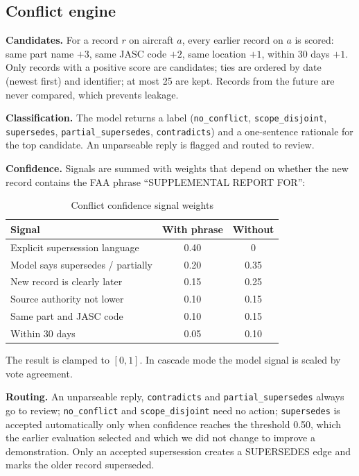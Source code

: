 \subsection{Conflict engine}

\textbf{Candidates.} For a record $r$ on aircraft $a$, every earlier record on $a$ is scored: same part name $+3$, same JASC code $+2$, same location $+1$, within 30 days $+1$. Only records with a positive score are candidates; ties are ordered by date (newest first) and identifier; at most 25 are kept. Records from the future are never compared, which prevents leakage.

\textbf{Classification.} The model returns a label (\texttt{no\_conflict}, \texttt{scope\_disjoint}, \texttt{supersedes}, \texttt{partial\_supersedes}, \texttt{contradicts}) and a one-sentence rationale for the top candidate. An unparseable reply is flagged and routed to review.

\textbf{Confidence.} Signals are summed with weights that depend on whether the new record contains the FAA phrase ``SUPPLEMENTAL REPORT FOR'':

\begin{table}[!htbp]
\centering
\caption{Conflict confidence signal weights}
\label{tab:confidence-weights}
\small
\begin{tabularx}{\textwidth}{@{}L c c@{}}
\toprule
Signal & With phrase & Without \\
\midrule
Explicit supersession language & 0.40 & 0 \\
Model says supersedes / partially & 0.20 & 0.35 \\
New record is clearly later & 0.15 & 0.25 \\
Source authority not lower & 0.10 & 0.15 \\
Same part and JASC code & 0.10 & 0.15 \\
Within 30 days & 0.05 & 0.10 \\
\bottomrule
\end{tabularx}
\end{table}

The result is clamped to $[0,1]$. In cascade mode the model signal is scaled by vote agreement.

\textbf{Routing.} An unparseable reply, \texttt{contradicts} and \texttt{partial\_supersedes} always go to review; \texttt{no\_conflict} and \texttt{scope\_disjoint} need no action; \texttt{supersedes} is accepted automatically only when confidence reaches the threshold 0.50, which the earlier evaluation selected and which we did not change to improve a demonstration. Only an accepted supersession creates a SUPERSEDES edge and marks the older record superseded.

